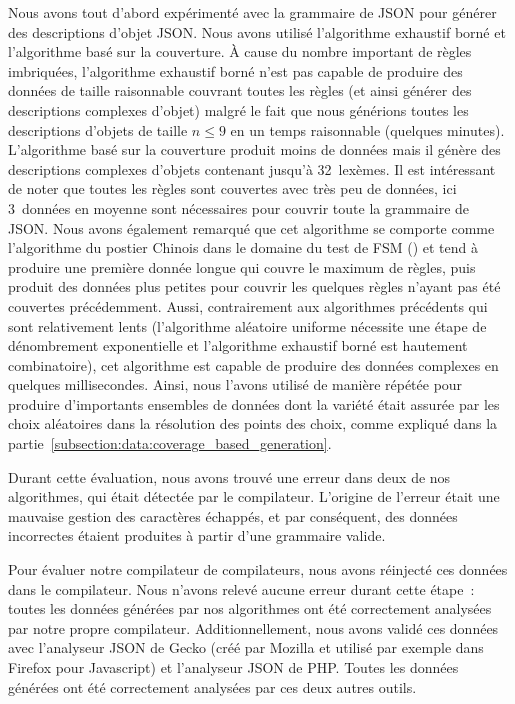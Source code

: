 Nous avons tout d'abord expérimenté avec la grammaire de JSON pour générer des
descriptions d'objet JSON. Nous avons utilisé l'algorithme exhaustif borné et
l'algorithme basé sur la couverture. À cause du nombre important de règles
imbriquées, l'algorithme exhaustif borné n'est pas capable de produire des
données de taille raisonnable couvrant toutes les règles (et ainsi générer des
descriptions complexes d'objet) malgré le fait que nous générions toutes les
descriptions d'objets de taille $n \leq 9$ en un temps raisonnable (quelques
minutes). L'algorithme basé sur la couverture produit moins de données mais il
génère des descriptions complexes d'objets contenant jusqu'à 32~lexèmes. Il est
intéressant de noter que toutes les règles sont couvertes avec très peu de
données, ici 3~données en moyenne sont nécessaires pour couvrir toute la
grammaire de JSON. Nous avons également remarqué que cet algorithme se comporte
comme l'algorithme du postier Chinois dans le domaine du test de FSM
() et tend à produire une première donnée
longue qui couvre le maximum de règles, puis produit des données plus petites
pour couvrir les quelques règles n'ayant pas été couvertes précédemment. Aussi,
contrairement aux algorithmes précédents qui sont relativement lents
(l'algorithme aléatoire uniforme nécessite une étape de dénombrement
exponentielle et l'algorithme exhaustif borné est hautement combinatoire), cet
algorithme est capable de produire des données complexes en quelques
millisecondes. Ainsi, nous l'avons utilisé de manière répétée pour produire
d'importants ensembles de données dont la variété était assurée par les choix
aléatoires dans la résolution des points des choix, comme expliqué dans la
partie~\ref{subsection:data:coverage_based_generation}.

Durant cette évaluation, nous avons trouvé une erreur dans deux de nos
algorithmes, qui était détectée par le compilateur. L'origine de l'erreur
était une mauvaise gestion des caractères échappés, et par conséquent, des
données incorrectes étaient produites à partir d'une grammaire valide.

Pour évaluer notre compilateur de compilateurs, nous avons réinjecté ces données
dans le compilateur. Nous n'avons relevé aucune erreur durant cette étape~:
toutes les données générées par nos algorithmes ont été correctement analysées
par notre propre compilateur. Additionnellement, nous avons validé ces données
avec l'analyseur JSON de Gecko (créé par Mozilla et utilisé par exemple dans
Firefox pour Javascript) et l'analyseur JSON de PHP. Toutes les données générées
ont été correctement analysées par ces deux autres outils.

